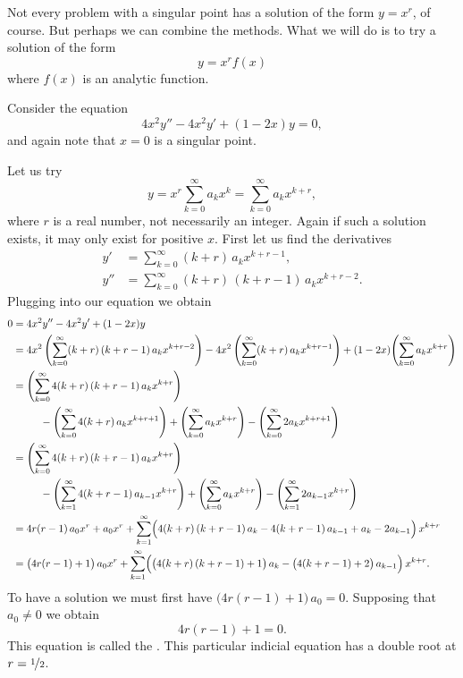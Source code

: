 Not every problem with a singular point has a solution of the form $y=x^r$, of
course.  But perhaps we can combine the methods.  What we will do is
to try a solution of the form
\begin{equation*}
y = x^r f(x)
\end{equation*}
where $f(x)$ is an analytic function.

\begin{example}
Consider the equation
\begin{equation*}
4 x^2 y'' - 4 x^2 y' + (1-2x)y = 0,
\end{equation*}
and again note that $x=0$ is a singular point.

Let us try
\begin{equation*}
y = x^r \sum_{k=0}^\infty a_k x^k
= \sum_{k=0}^\infty a_k x^{k+r} ,
\end{equation*}
where $r$ is a real number, not necessarily an integer.
Again if such a solution exists, it may only exist for positive $x$.
First let us find the derivatives
\begin{align*}
y' & = \sum_{k=0}^\infty (k+r)\, a_k x^{k+r-1} , \\
y'' & = \sum_{k=0}^\infty (k+r)\,(k+r-1)\, a_k x^{k+r-2} .
\end{align*}
Plugging into our equation we obtain
\begin{equation*}
\begin{split}
0 & = 4x^2y''-4x^2y'+(1-2x)y
\\
&= 
4x^2 \, \Biggl( \sum_{k=0}^\infty (k+r)\,(k+r-1) \, a_k x^{k+r-2}  \Biggr)
-
4x^2 \, \Biggl( \sum_{k=0}^\infty (k+r) \, a_k x^{k+r-1}  \Biggr)
+
(1-2x)
\Biggl( \sum_{k=0}^\infty a_k x^{k+r} \Biggr)
\\
&=
\Biggl( \sum_{k=0}^\infty 4 (k+r)\,(k+r-1) \, a_k x^{k+r}  \Biggr)
\\
& \phantom{mmm}
-
\Biggl( \sum_{k=0}^\infty 4 (k+r) \, a_k x^{k+r+1}  \Biggr)
+
\Biggl( \sum_{k=0}^\infty a_k x^{k+r} \Biggr)
-
\Biggl( \sum_{k=0}^\infty 2a_k x^{k+r+1} \Biggr)
\\
&=
\Biggl( \sum_{k=0}^\infty 4 (k+r)\,(k+r-1) \, a_k x^{k+r}  \Biggr)
\\
& \phantom{mmm}
-
\Biggl( \sum_{k=1}^\infty 4 (k+r-1) \, a_{k-1} x^{k+r}  \Biggr)
+
\Biggl( \sum_{k=0}^\infty a_k x^{k+r} \Biggr)
-
\Biggl( \sum_{k=1}^\infty 2a_{k-1} x^{k+r} \Biggr)
\\
&=
4r(r-1) \, a_0 x^r  + a_0 x^r + 
\sum_{k=1}^\infty
\Bigl( 4 (k+r)\,(k+r-1) \, a_k
-
4 (k+r-1) \, a_{k-1}
+
a_k
-
2a_{k-1} \Bigr) \, x^{k+r} 
\\
&=
\bigl( 4r(r-1) + 1 \bigr) \, a_0 x^r + 
\sum_{k=1}^\infty
\Bigl( \bigl( 4 (k+r)\,(k+r-1) + 1 \bigr) \, a_k
-
\bigl( 4 (k+r-1) + 2 \bigr) \, a_{k-1} \Bigr) \, x^{k+r} .
\end{split}
\end{equation*}
To have a solution we must first have
$\bigl( 4r(r-1) + 1 \bigr) \, a_0 = 0$.  Supposing that $a_0 \not= 0$
we obtain 
\begin{equation*}
4r(r-1) + 1 = 0 .
\end{equation*}
This equation is called the \emph{}.
This particular indicial
equation has a double root at $r = \nicefrac{1}{2}$.


\end{example}
